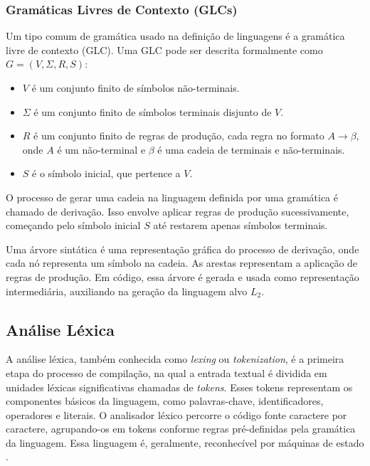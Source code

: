 \documentclass[english, 
               brazil, 
               bsc] %
               {dcomp-abntex2}
\begin{document}
\subsubsection{Gramáticas Livres de Contexto (GLCs)}

Um tipo comum de gramática usado na definição de linguagens é a gramática livre de contexto (GLC).  Uma GLC pode ser descrita formalmente como $ G=(V,\Sigma,R,S)$:

\begin{itemize}
  \item $V$ é um conjunto finito de símbolos não-terminais.

  \item $\Sigma$ é um conjunto finito de símbolos terminais disjunto de $V$.

  \item $R$ é um conjunto finito de regras de produção, cada regra no formato $A \rightarrow \beta$, onde $A$ é um não-terminal e $\beta$ é uma cadeia de terminais e não-terminais.

  \item $S$ é o símbolo inicial, que pertence a $V$.
\end{itemize}

O processo de gerar uma cadeia na linguagem definida por uma gramática é chamado de derivação. Isso envolve aplicar regras de produção sucessivamente, começando pelo símbolo inicial $S$ até restarem apenas símbolos terminais.

Uma árvore sintática é uma representação gráfica do processo de derivação, onde cada nó representa um símbolo na cadeia. As arestas representam a aplicação de regras de produção. Em código, essa árvore é gerada e usada como representação intermediária,  auxiliando na geração da linguagem alvo $L_2$.


\subsection{Análise Léxica}
A análise léxica, também conhecida como \textit{lexing} ou \textit{tokenization}, é a primeira etapa do processo de compilação, na qual a entrada textual é dividida em unidades léxicas significativas chamadas de \textit{tokens}. Esses tokens representam os componentes básicos da linguagem, como palavras-chave, identificadores, operadores e literais. O analisador léxico percorre o código fonte caractere por caractere, agrupando-os em tokens conforme regras pré-definidas pela gramática da linguagem. Essa linguagem é, geralmente, reconhecível por máquinas de estado \cite{automata}.
\end{document}
